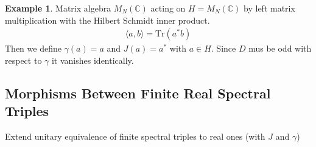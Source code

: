\documentclass[a4paper]{article}
\theoremstyle{definition}
\theoremstyle{definition}
\theoremstyle{definition}
\newtheorem{example}{Example}
\theoremstyle{theorem}
\theoremstyle{theorem}
\begin{document}
\begin{example}
    Matrix algebra $M_N(\mathbb{C})$ acting on $H=M_N(\mathbb{C})$ by left
    matrix multiplication with the Hilbert Schmidt inner product.
    \begin{align}
        \langle a , b \rangle = \text{Tr}(a^* b)
    \end{align}
    Then we define $\gamma (a) = a$ and $J(a) = a^*$ with $a\in H$.
    Since $D$ mus be odd with respect to $\gamma$ it vanishes identically.
\end{example}

\subsection{Morphisms Between Finite Real Spectral Triples}
Extend unitary equivalence of finite spectral triples to real ones (with $J$
and $\gamma$)
\end{document}
